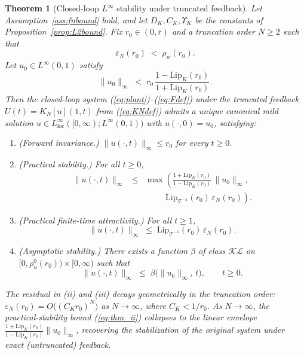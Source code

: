 \documentclass[amsthm]{autart}
\theoremstyle{plain}
\newtheorem{theorem}{Theorem}
\theoremstyle{definition}
\newcommand{\Tcal}{\mathcal{T}}
\newcommand{\Linf}{L^\infty}
\newcommand{\Lipk}{\mathrm{Lip}_K}
\newcommand{\LipT}{\mathrm{Lip}_{\Tcal^{-1}}}
\newcommand{\eps}{\varepsilon}
\begin{document}
\begin{theorem}[Closed-loop $\Linf$ stability under truncated feedback]\label{thm:main}
Let Assumption~\ref{ass:fnbound} hold, and let $D_K, C_K, \Upsilon_K$ be the constants of Proposition~\ref{prop:L2bound}. Fix $r_0 \in (0, \bar r)$ and a truncation order $N \ge 2$ such that
\begin{equation}
\eps_N(r_0) \;<\; \rho_w(r_0).
\label{eq:cond_resid}
\end{equation}
Let $u_0 \in \Linf(0,1)$ satisfy
\begin{equation}
\|u_0\|_\infty \;<\; r_0\,\frac{1 - \Lipk(r_0)}{1 + \Lipk(r_0)}.
\label{eq:cond_init}
\end{equation}
Then the closed-loop system (\ref{eq:plant})--(\ref{eq:Fdef}) under the truncated feedback $U(t) = K_N[u](1,t)$ from (\ref{eq:KNdef}) admits a unique canonical mild solution $u \in \Linf_{\mathrm{loc}}([0,\infty); \Linf(0,1))$ with $u(\cdot, 0) = u_0$, satisfying:
\begin{enumerate}[label=(\roman*)]
\item \emph{(Forward invariance.)} $\|u(\cdot, t)\|_\infty \le r_0$ for every $t \ge 0$.
\item \emph{(Practical stability.)} For all $t \ge 0$,
\begin{eqnarray}
\|u(\cdot,t)\|_\infty &\le& \max\!\left(\frac{1 + \Lipk(r_0)}{1 - \Lipk(r_0)}\,\|u_0\|_\infty,\right. \nonumber \\
&& \quad\quad\;\, \left.\LipT(r_0)\,\eps_N(r_0)\right).
\label{eq:thm_ii}
\end{eqnarray}
\item \emph{(Practical finite-time attractivity.)} For all $t \ge 1$,
\begin{equation}
\|u(\cdot,t)\|_\infty \;\le\; \LipT(r_0)\, \eps_N(r_0).
\label{eq:thm_iii}
\end{equation}
\item \emph{(Asymptotic stability.)} There exists a function $\beta$ of class $\mathcal{KL}$ on $[0, \rho_u^0(r_0)) \times [0, \infty)$ such that
\begin{equation}
\|u(\cdot,t)\|_\infty \;\le\; \beta\bigl(\|u_0\|_\infty,\, t\bigr), \qquad t \ge 0.
\label{eq:thm_iv}
\end{equation}
\end{enumerate}
The residual in (ii) and (iii) decays geometrically in the truncation order: $\eps_N(r_0) = O\bigl((C_K r_0)^N\bigr)$ as $N \to \infty$, where $C_K < 1/r_0$. As $N \to \infty$, the practical-stability bound (\ref{eq:thm_ii}) collapses to the linear envelope $\frac{1+\Lipk(r_0)}{1-\Lipk(r_0)}\|u_0\|_\infty$, recovering the stabilization of the original system under exact (untruncated) feedback.
\end{theorem}
\end{document}
